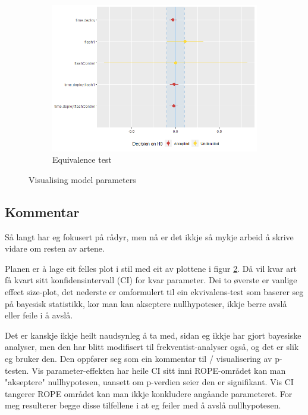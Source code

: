\begin{figure}
\begin{subfigure}{.8\textwidth}
	\includegraphics[scale=1]{../R/glmm_sp_files/figure-gfm/parameters-3.png}
\caption{Equivalence test}
		\label{fig:para_raa3}
	\end{subfigure}
		\caption{Visualising model parameters}
	\label{fig:para_sp}
\end{figure}




\subsection{Kommentar}

Så langt har eg fokusert på rådyr, men nå er det ikkje så mykje arbeid å skrive vidare om resten av artene.

Planen er å lage eit felles plot i stil med eit av plottene i figur \ref{fig:para_sp}. Då vil kvar art få kvart sitt konfidensintervall (CI) for kvar parameter.
Dei to øverste er vanlige effect size-plot, det nederste er omformulert til ein ekvivalens-test som baserer seg på bayesisk statistikk, kor man kan akseptere nullhypoteser, ikkje berre avslå eller feile i å avslå.

Det er kanskje ikkje heilt naudsynleg å ta med, sidan eg ikkje har gjort bayesiske analyser, men den har blitt modifisert til frekventist-analyser også, og det er slik eg bruker den.
Den oppfører seg som ein kommentar til / visualisering av p-testen. Vis parameter-effekten har heile CI sitt inni ROPE-området kan man "akseptere" nullhypotesen, uansett om p-verdien seier den er signifikant. Vis CI tangerer ROPE området kan man ikkje konkludere angåande parameteret. For meg resulterer begge disse tilfellene i at eg feiler med å avslå nullhypotesen.


